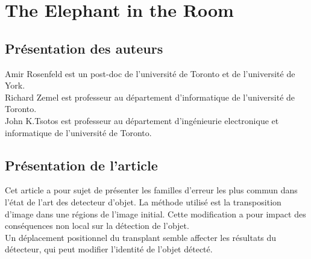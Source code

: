 \documentclass[12pt, letterpaper]{article}
\begin{document}
\section{The Elephant in the Room}
\subsection{Présentation des auteurs}
Amir Rosenfeld est un post-doc de l'université de Toronto et de l'université de York.\\
Richard Zemel est professeur au département d'informatique de l'université de Toronto.\\
John K.Tsotos est professeur au département d'ingénieurie electronique et informatique de l'université de Toronto.

\subsection{Présentation de l'article}
Cet article a pour sujet de présenter les familles d'erreur les plus commun dans l'état de l'art des 
detecteur d'objet. La méthode utilisé est la transposition d'image dans une régions de l'image initial.
Cette modification a pour impact des conséquences non local sur la détection de l'objet. \\
Un déplacement positionnel du transplant semble affecter les résultats du détecteur, qui peut modifier l'identité de l'objet détecté.
\end{document}
